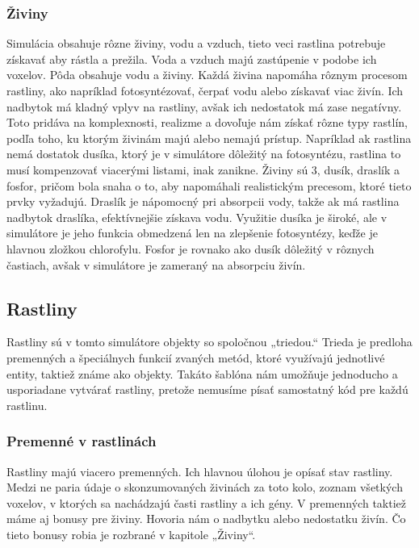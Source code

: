 \documentclass[12pt]{article}
\begin{document}
\subsubsection{Živiny}

Simulácia obsahuje rôzne živiny, vodu a vzduch, tieto veci rastlina potrebuje
získavať aby rástla a prežila. Voda a vzduch majú zastúpenie v podobe ich
voxelov. Pôda obsahuje vodu a živiny. Každá živina napomáha rôznym procesom
rastliny, ako napríklad fotosyntézovať, čerpať vodu alebo získavať viac živín.
Ich nadbytok má kladný vplyv na rastliny, avšak ich nedostatok má zase
negatívny. Toto pridáva na komplexnosti, realizme a dovoľuje nám získať rôzne
typy rastlín, podľa toho, ku ktorým živinám majú alebo nemajú prístup.
Napríklad ak rastlina nemá dostatok dusíka, ktorý je v simulátore dôležitý
na fotosyntézu, rastlina to musí kompenzovať viacerými listami, inak zanikne.
Živiny sú 3, dusík, draslík a fosfor, pričom bola snaha o to, aby napomáhali
realistickým precesom, ktoré tieto prvky vyžadujú. Draslík je nápomocný pri
absorpcii vody, takže ak má rastlina nadbytok draslíka, efektívnejšie získava
vodu. Využitie dusíka je široké, ale v simulátore je jeho funkcia obmedzená
len na zlepšenie fotosyntézy, keďže je hlavnou zložkou chlorofylu. Fosfor je
rovnako ako dusík dôležitý v rôznych častiach, avšak v simulátore je zameraný
na absorpciu živín.

\subsection{Rastliny}

Rastliny sú v tomto simulátore objekty so spoločnou „triedou.“ Trieda je
predloha premenných a špeciálnych funkcií zvaných metód, ktoré využívajú
jednotlivé entity, taktiež známe ako objekty. Takáto šablóna nám umožňuje
jednoducho a usporiadane vytvárať rastliny, pretože nemusíme písať samostatný
kód pre každú rastlinu.

\subsubsection{Premenné v rastlinách}

Rastliny majú viacero premenných. Ich hlavnou úlohou je opísať stav rastliny.
Medzi ne paria údaje o skonzumovaných živinách za toto kolo, zoznam všetkých
voxelov, v ktorých sa nachádzajú časti rastliny a ich gény. V premenných
taktiež máme aj bonusy pre živiny. Hovoria nám o nadbytku alebo nedostatku
živín. Čo tieto bonusy robia je rozbrané v kapitole „Živiny“.
\end{document}
